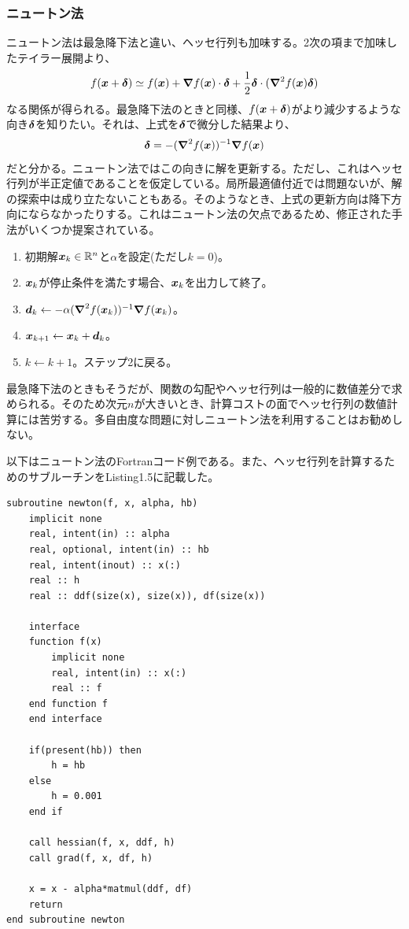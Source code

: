 \documentclass[dvipdfmx, 9pt, a4paper]{jsarticle}
\numberwithin{equation}{section}
\newcommand{\bm}[1]{{\mbox{\boldmath $#1$}}}
\begin{document}
\subsubsection{ニュートン法}
ニュートン法は最急降下法と違い、ヘッセ行列も加味する。2次の項まで加味したテイラー展開より、
\begin{equation}
f(\bm x+\bm \delta)\simeq f(\bm x)+\bm \nabla f(\bm x)\cdot \bm \delta + \frac{1}{2}\bm \delta \cdot (\bm \nabla^2f(\bm x)\bm \delta) \notag
\end{equation}
なる関係が得られる。最急降下法のときと同様、$f(\bm x+\bm \delta)$がより減少するような向き$\bm \delta$を知りたい。それは、上式を$\bm \delta$で微分した結果より、
\begin{equation}
\bm \delta = -(\bm \nabla^2 f(\bm x))^{-1}\bm \nabla f(\bm x) \notag
\end{equation}
だと分かる。ニュートン法ではこの向きに解を更新する。ただし、これはヘッセ行列が半正定値であることを仮定している。局所最適値付近では問題ないが、解の探索中は成り立たないこともある。そのようなとき、上式の更新方向は降下方向にならなかったりする。これはニュートン法の欠点であるため、修正された手法がいくつか提案されている。
\begin{tcolorbox}[title=ニュートン法]
\begin{enumerate}
\item 初期解$\bm x_k \in \mathbb{R}^n$と$\alpha$を設定(ただし$k=0$)。
\item $\bm x_k$が停止条件を満たす場合、$\bm x_k$を出力して終了。
\item $\bm d_k \leftarrow -\alpha(\bm \nabla^2 f(\bm x_k))^{-1}\bm \nabla f(\bm x_k)$。
\item $\bm x_{k+1} \leftarrow \bm x_k + \bm d_k$。
\item $k \leftarrow k+1$。ステップ2に戻る。
\end{enumerate}
\end{tcolorbox}\par
最急降下法のときもそうだが、関数の勾配やヘッセ行列は一般的に数値差分で求められる。そのため次元$n$が大きいとき、計算コストの面でヘッセ行列の数値計算には苦労する。多自由度な問題に対しニュートン法を利用することはお勧めしない。\par
以下はニュートン法のFortranコード例である。また、ヘッセ行列を計算するためのサブルーチンをListing1.5に記載した。
\begin{lstlisting}[caption=ニュートン法]
subroutine newton(f, x, alpha, hb)
	implicit none
	real, intent(in) :: alpha
	real, optional, intent(in) :: hb
	real, intent(inout) :: x(:)
	real :: h
	real :: ddf(size(x), size(x)), df(size(x))

	interface
	function f(x)
		implicit none
		real, intent(in) :: x(:)
		real :: f
	end function f
	end interface

	if(present(hb)) then
		h = hb
	else
		h = 0.001
	end if

	call hessian(f, x, ddf, h)
	call grad(f, x, df, h)

	x = x - alpha*matmul(ddf, df)
	return
end subroutine newton
\end{lstlisting}
\end{document}
